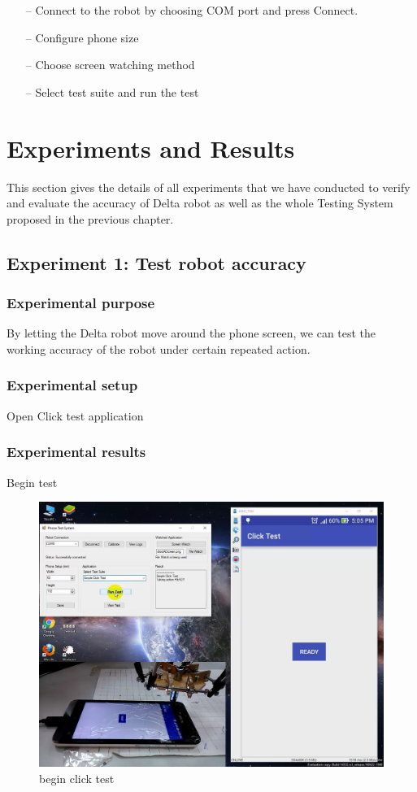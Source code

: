 	\begin{itemize}
		\item[--] Connect to the robot by choosing COM port and press Connect.
		\item[--] Configure phone size
		\item[--] Choose screen watching method
		\item[--] Select test suite and run the test
	\end{itemize}

\section{Experiments and Results}
This section gives the details of all experiments that we have conducted to verify and evaluate the accuracy of Delta robot as well as the whole Testing System proposed in the previous chapter.

\subsection{Experiment 1: Test robot accuracy}
\subsubsection{Experimental purpose}
By letting the Delta robot move around the phone screen, we can test the working accuracy of the robot under certain repeated action.

\subsubsection{Experimental setup}
Open Click test application

\subsubsection{Experimental results}
Begin test
	\begin{figure}[H]
		\centering
		\includegraphics[scale=0.5]{Chapters/Fig/click_start.png}
		\caption{begin click test}
		\label{fig:click_start}
	\end{figure}

